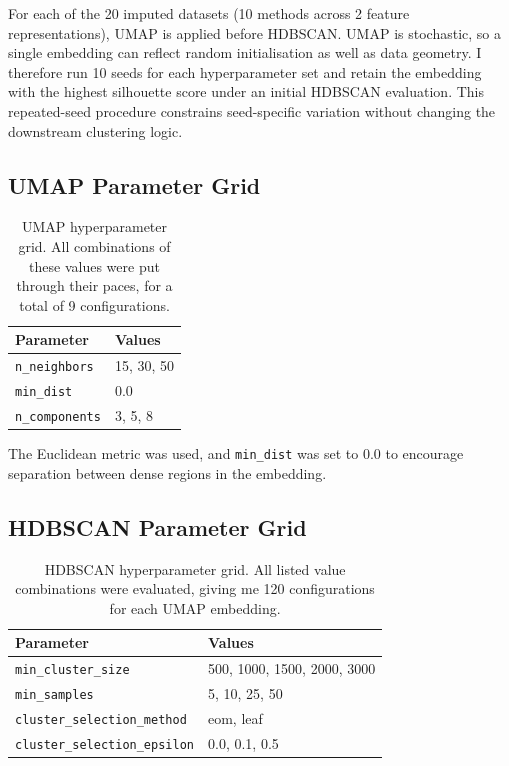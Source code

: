 For each of the 20 imputed datasets (10 methods across 2 feature representations), UMAP is applied before HDBSCAN. UMAP is stochastic, so a single embedding can reflect random initialisation as well as data geometry. I therefore run 10 seeds for each hyperparameter set and retain the embedding with the highest silhouette score under an initial HDBSCAN evaluation. This repeated-seed procedure constrains seed-specific variation without changing the downstream clustering logic.

\subsection{UMAP Parameter Grid}

\begin{table}[ht]
\caption{UMAP hyperparameter grid. All combinations of these values were put through their paces, for a total of 9 configurations.}
\label{tab:umap_grid}
\centering
\begin{tabular}{l l}
\toprule
\textbf{Parameter} & \textbf{Values} \\
\midrule
\texttt{n\_neighbors}  & 15, 30, 50 \\
\texttt{min\_dist}     & 0.0 \\
\texttt{n\_components} & 3, 5, 8 \\
\bottomrule
\end{tabular}
\end{table}

The Euclidean metric was used, and \texttt{min\_dist} was set to 0.0 to encourage separation between dense regions in the embedding.

\subsection{HDBSCAN Parameter Grid}

\begin{table}[ht]
\caption{HDBSCAN hyperparameter grid. All listed value combinations were evaluated, giving me 120 configurations for each UMAP embedding.}
\label{tab:hdbscan_grid}
\centering
\begin{tabular}{l l}
\toprule
\textbf{Parameter} & \textbf{Values} \\
\midrule
\texttt{min\_cluster\_size}          & 500, 1000, 1500, 2000, 3000 \\
\texttt{min\_samples}                & 5, 10, 25, 50 \\
\texttt{cluster\_selection\_method}  & eom, leaf \\
\texttt{cluster\_selection\_epsilon} & 0.0, 0.1, 0.5 \\
\bottomrule
\end{tabular}
\end{table}

